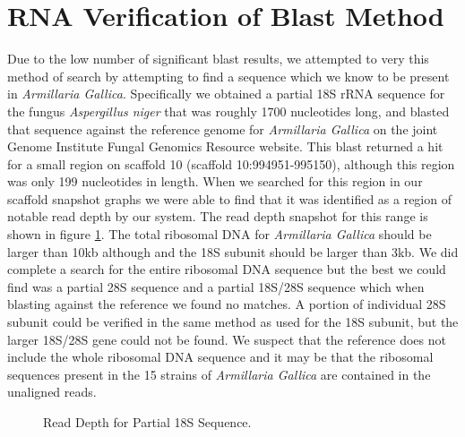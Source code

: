 \documentclass[12pt]{article}
\begin{document}
\section{RNA Verification of Blast Method}
\vspace{-0.5cm}
	Due to the low number of significant blast results, we attempted to very this method of search by attempting to find a sequence which we know to be present in \textit{Armillaria Gallica}. Specifically we obtained a partial 18S rRNA sequence for the fungus \textit{Aspergillus niger} that was roughly 1700 nucleotides long, and blasted that sequence against the reference genome for \textit{Armillaria Gallica} on the joint Genome Institute Fungal Genomics Resource website. This blast returned a hit for a small region on scaffold 10 (scaffold 10:994951-995150), although this region was only 199 nucleotides in length. When we searched for this region in our scaffold snapshot graphs we were able to find that it was identified as a region of notable read depth by our system. The read depth snapshot for this range is shown in figure \ref{rdsnp18Srrna}. The total ribosomal DNA for \textit{Armillaria Gallica} should be larger than 10kb although and the 18S subunit should be larger than 3kb. We did complete a search for the entire ribosomal DNA sequence but the best we could find was a partial 28S sequence and a partial 18S/28S sequence which when blasting against the reference we found no matches. A portion of individual 28S subunit could be verified in the same method as used for the 18S subunit, but the larger 18S/28S gene could not be found. We suspect that the reference does not include the whole ribosomal DNA sequence and it may be that the ribosomal sequences present in the 15 strains of \textit{Armillaria Gallica} are contained in the unaligned reads. 
      \begin{figure}[H]
	\begin{centering}
 		\begin{singlespace}
			\vspace{-0.5cm}
			\caption[Read Depth for Partial 18S Sequence.]{Read Depth for Partial 18S Sequence.}\label{rdsnp18Srrna}
		\end{singlespace}
	\end{centering}
\end{figure}
%
%
\vspace{-1cm}
\end{document}
